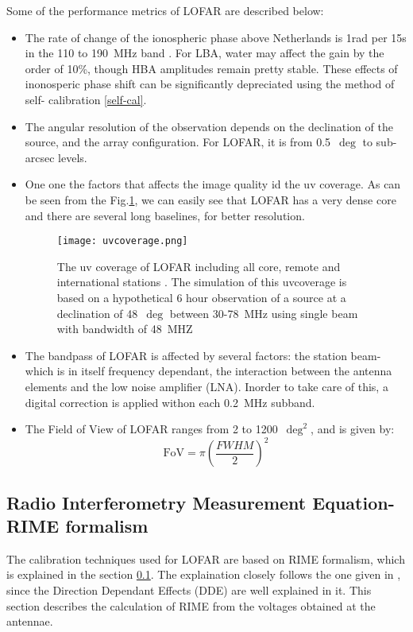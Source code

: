 \documentclass[../main/thesis_msc.tex]{subfiles}
\begin{document}
Some of the performance metrics of LOFAR are described below:
\begin{itemize}
\item The rate of change of the ionospheric phase above Netherlands is 1rad per 15s in the 110 to 190~MHz band \citep{LOFAR}. For LBA, water may affect the gain by the order of 10\%,  though HBA amplitudes remain pretty stable. These effects of inonosperic phase shift can be significantly depreciated using the method of self- calibration \ref{self-cal}. 
\item The angular resolution of the observation depends on the declination of the source, and the array configuration. For LOFAR, it is from 0.5~$\deg$  to sub-arcsec levels. 
\item One one the factors that affects the image quality id the uv coverage. As can be seen from the Fig.\ref{uv}, we can easily see that LOFAR has a very dense core and there are several long baselines, for better resolution.

\begin{figure}[h]
\centering
\texttt{[image: uvcoverage.png]}
\caption{The uv coverage of LOFAR including all core, remote and international stations \citep{LOFAR}. The simulation of this uvcoverage is based on a hypothetical 6 hour observation of a source at a declination of 48~$\deg$ between 30-78~MHz using single beam with bandwidth of 48~MHZ}
\label{uv}
\end{figure}

\item The bandpass of LOFAR is affected by several factors: the station beam- which is in itself frequency dependant, the interaction between the antenna elements and the low noise amplifier (LNA). Inorder to take care of this, a digital correction is applied withon each 0.2~MHz subband.
\item The Field of View of LOFAR ranges from 2 to 1200~$\deg ^2$, and is given by:
\begin{equation}
\textrm{FoV}=\pi\left(\frac{FWHM}{2}\right)^2
\end{equation}

\end{itemize}


\subsection{Radio Interferometry Measurement Equation- RIME formalism}
\label{sec:rime}

The calibration techniques used for LOFAR are based on RIME formalism, which is explained in the section \ref{sec:rime}. The explaination closely follows the one given in \citep{rime}, since the Direction Dependant Effects (DDE) are well explained in it. This section describes the calculation of RIME from the voltages obtained at the antennae.\\
\end{document}
